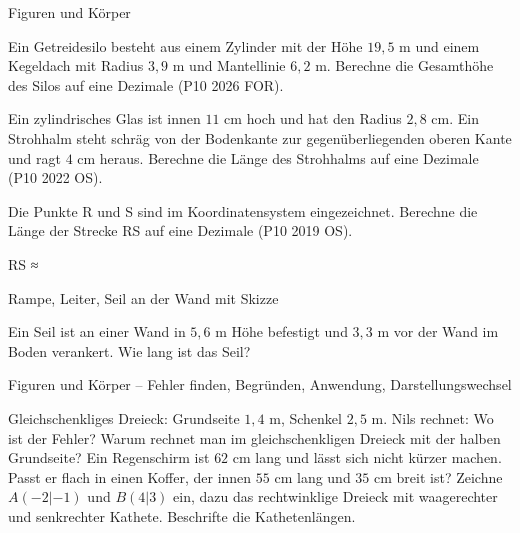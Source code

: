 \begin{aufgabe}{Figuren und Körper}
\begin{teile}
\teil Ein Getreidesilo besteht aus einem Zylinder mit der Höhe $19{,}5$ m und einem Kegeldach mit Radius $3{,}9$ m und Mantellinie $6{,}2$ m. Berechne die Gesamthöhe des Silos auf eine Dezimale \hfill (P10 2026 FOR).

\leerfeld[m]
\teil Ein zylindrisches Glas ist innen $11$ cm hoch und hat den Radius $2{,}8$ cm. Ein Strohhalm steht schräg von der Bodenkante zur gegenüberliegenden oberen Kante und ragt $4$ cm heraus. Berechne die Länge des Strohhalms auf eine Dezimale \hfill (P10 2022 OS).

\leerfeld[cm]
\teil Die Punkte R und S sind im Koordinatensystem eingezeichnet. Berechne die Länge der Strecke RS auf eine Dezimale \hfill (P10 2019 OS).

\begin{ksys}[xmin=-4,xmax=5,ymin=-4,ymax=4,ablesen]   \end{ksys}
RS ≈ \leerfeld
\end{teile}
\end{aufgabe}

\begin{aufgabe}{Rampe, Leiter, Seil an der Wand mit Skizze}
\begin{teile}
\teil Ein Seil ist an einer Wand in $5{,}6$ m Höhe befestigt und $3{,}3$ m vor der Wand im Boden verankert. Wie lang ist das Seil?

\leerfeld[m]
\end{teile}
\end{aufgabe}

\begin{aufgabe}{Figuren und Körper – Fehler finden, Begründen, Anwendung, Darstellungswechsel}
\begin{teile}
\teil Gleichschenkliges Dreieck: Grundseite $1{,}4$ m, Schenkel $2{,}5$ m. Nils rechnet:  Wo ist der Fehler?
\teil Warum rechnet man im gleichschenkligen Dreieck mit der halben Grundseite?
\teil Ein Regenschirm ist $62$ cm lang und lässt sich nicht kürzer machen. Passt er flach in einen Koffer, der innen $55$ cm lang und $35$ cm breit ist?
\teil Zeichne $A(-2 | -1)$ und $B(4 | 3)$ ein, dazu das rechtwinklige Dreieck mit waagerechter und senkrechter Kathete. Beschrifte die Kathetenlängen.

\begin{ksys}[xmin=-3,xmax=5,ymin=-2,ymax=4] \end{ksys}
\end{teile}
\end{aufgabe}
